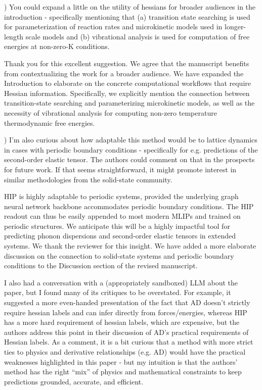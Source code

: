 \documentclass[pdflatex,sn-mathphys-num]{sn-jnl}
\begin{document}
) You could expand a little on the utility of hessians for broader audiences in the introduction - specifically mentioning that (a) transition state searching is used for parameterization of reaction rates and microkinetic models used in longer-length scale models and (b) vibrational analysis is used for computation of free energies at non-zero-K conditions.

{\color{mycustomcolour}
\noindent Thank you for this excellent suggestion. We agree that the manuscript benefits from contextualizing the work for a broader audience. We have expanded the Introduction to elaborate on the concrete computational workflows that require Hessian information. Specifically, we explicitly mention the connection between transition-state searching and parameterizing microkinetic models, as well as the necessity of vibrational analysis for computing non-zero temperature thermodynamic free energies.
}
\vspace{2mm}

) I’m also curious about how adaptable this method would be to lattice dynamics in cases with periodic boundary conditions - specifically for e.g. predictions of the second-order elastic tensor. The authors could comment on that in the prospects for future work. If that seems straightforward, it might promote interest in similar methodologies from the solid-state community.

{\color{mycustomcolour}
\noindent HIP is highly adaptable to periodic systems, provided the underlying graph neural network backbone accommodates periodic boundary conditions. The HIP readout can thus be easily appended to most modern MLIPs and trained on periodic structures. We anticipate this will be a highly impactful tool for predicting phonon dispersions and second-order elastic tensors in extended systems. We thank the reviewer for this insight. We have added a more elaborate discussion on the connection to solid-state systems and periodic boundary conditions to the Discussion section of the revised manuscript.

}
\vspace{2mm}

\noindent I also had a conversation with a (appropriately sandboxed) LLM about the paper, but I found many of its critiques to be overstated. For example, it suggested a more even-handed presentation of the fact that AD doesn’t strictly require hessian labels and can infer directly from forces/energies, whereas HIP has a more hard requirement of hessian labels, which are expensive, but the authors address this point in their discussion of AD’s practical requirements of Hessian labels. As a comment, it is a bit curious that a method with more strict ties to physics and derivative relationships (e.g. AD) would have the practical weaknesses highlighted in this paper - but my intuition is that the authors’ method has the right “mix” of physics and mathematical constraints to keep predictions grounded, accurate, and efficient.
\end{document}
